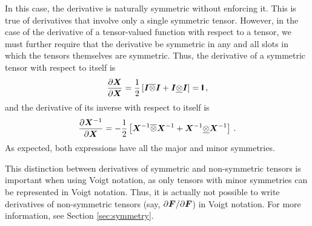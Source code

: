 \documentclass[10pt,letterpaper,oneside]{report}
\newcommand{\ten}[1]{\mbox{\boldmath $#1$}{}}
\newcommand{\tenf}[1]{\mbox{{\sffamily{\bfseries {#1}}}}}
\begin{document}
In this case, the derivative is naturally symmetric without enforcing it.  This is true of derivatives that involve only a single symmetric tensor.  However, in the case of the derivative of a tensor-valued function with respect to a tensor, we must further require that the derivative be symmetric in any and all slots in which the tensors themselves are symmetric.  Thus, the derivative of a symmetric tensor with respect to itself is
\begin{equation}
\frac{\partial \ten{X}}{\partial \ten{X}} = \frac{1}{2} \left[ \ten{I} \overline{\otimes} \ten{I} + \ten{I} \underline{\otimes} \ten{I} \right] = \tenf{I} \, , 
\end{equation}
and the derivative of its inverse with respect to itself is
\begin{equation}
\frac{\partial \ten{X}^{-1}}{\partial \ten{X}} = - \frac{1}{2} \left[ \ten{X}^{-1} \overline{\otimes} \ten{X}^{-1} + \ten{X}^{-1} \underline{\otimes} \ten{X}^{-1} \right] \, .
\end{equation}
As expected, both expressions have all the major and minor symmetries.  

This distinction between derivatives of symmetric and non-symmetric tensors is important when using Voigt notation, as only tensors with minor symmetries can be represented in Voigt notation.  Thus, it is actually not possible to write derivatives of non-symmetric tensors (say, $\partial \ten{F} / \partial \ten{F}$) in Voigt notation.  For more information, see Section \ref{sec:symmetry}.
\end{document}
